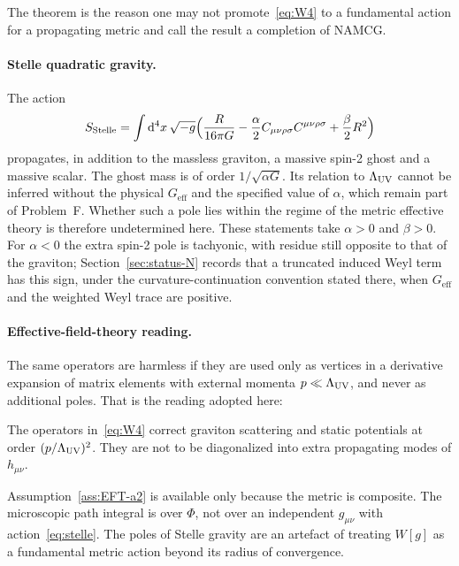 The theorem is the reason one may not promote~\eqref{eq:W4} to a
fundamental action for a propagating metric and call the result a
completion of NAMCG.

\paragraph{Stelle quadratic gravity.}
The action
\begin{equation}
  \label{eq:stelle}
  S_{\mathrm{Stelle}}
  =\int\mathrm{d}^4x\,\sqrt{-g}
   \Bigl(
     \frac{R}{16\pi G}
     -\frac{\alpha}{2}C_{\mu\nu\rho\sigma}C^{\mu\nu\rho\sigma}
     +\frac{\beta}{2}R^2
   \Bigr)
\end{equation}
propagates, in addition to the massless graviton, a massive spin-2
ghost and a massive scalar. The ghost mass is of order
\(1/\sqrt{\alpha G}\). Its relation to \(\Lambda_{\mathrm{UV}}\) cannot be inferred
without the physical \(G_{\mathrm{eff}}\) and the specified value of
\(\alpha\), which remain part of Problem~F. Whether such a pole lies
within the regime of the metric effective theory is therefore
undetermined here.
These statements take \(\alpha>0\) and \(\beta>0\). For \(\alpha<0\) the
extra spin-2 pole is tachyonic, with residue still opposite to that of
the graviton; Section~\ref{sec:status-N} records that a truncated
induced Weyl term has this sign, under the curvature-continuation
convention stated there, when \(G_{\mathrm{eff}}\) and the
weighted Weyl trace are positive.

\paragraph{Effective-field-theory reading.}
The same operators are harmless if they are used only as vertices
in a derivative expansion of matrix elements with external momenta
\(p\ll\Lambda_{\mathrm{UV}}\), and never as additional poles. That is the reading
adopted here:

\begin{assumption}
  \label{ass:EFT-a2}
  The operators in~\eqref{eq:W4} correct graviton scattering and
  static potentials at order \((p/\Lambda_{\mathrm{UV}})^2\). They are not to be
  diagonalized into extra propagating modes of \(h_{\mu\nu}\).
\end{assumption}

Assumption~\ref{ass:EFT-a2} is available only because the metric is
composite. The microscopic path integral is over \(\Phi\), not over
an independent \(g_{\mu\nu}\) with action~\eqref{eq:stelle}. The
poles of Stelle gravity are an artefact of treating \(W[g]\) as a
fundamental metric action beyond its radius of convergence.

